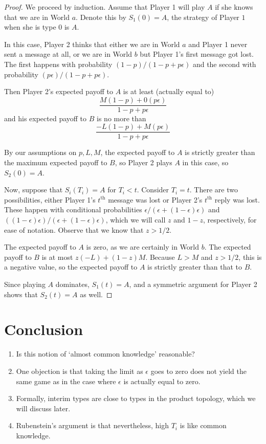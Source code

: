 \begin{proof}
	We proceed by induction.  Assume that Player 1 will play $A$ if she knows that we are in World $a$.  Denote this by $S_1(0)=A$, the strategy of Player $1$ when she is type 0 is $A$.
	
	In this case, Player 2 thinks that either we are in World $a$ and Player 1 never sent a message at all, or we are in World $b$ but Player 1's first message got lost.  The first happens with probability $(1-p)/(1-p+p\epsilon)$ and the second with probability $(p\epsilon)/(1-p+p\epsilon)$.
	
	Then Player 2's expected payoff to $A$ is at least (actually equal to)
	$$\frac{M(1-p)+0(p\epsilon)}{1-p+p\epsilon}$$ and his expected payoff to $B$ is no more than $$\frac{-L(1-p)+M(p\epsilon)}{1-p+p\epsilon}$$
	
	By our assumptions on $p,L,M$, the expected payoff to $A$ is strictly greater than the maximum expected payoff to $B$, so Player 2 plays $A$ in this case, so $S_2(0)=A$.
	
	Now, suppose that $S_i(T_i)=A$ for $T_i<t$.  Consider $T_i=t$.  There are two possibilities, either Player 1's $t^{\text{th}}$ message was lost or Player 2's $t^\text{th}$ reply was lost.  These happen with conditional probabilities $\epsilon/(\epsilon+(1-\epsilon)\epsilon)$ and $((1-\epsilon)\epsilon)/(\epsilon+(1-\epsilon)\epsilon)$, which we will call $z$ and $1-z$, respectively, for ease of notation.  Observe that we know that $z>1/2$.
	
	The expected payoff to $A$ is zero, as we are certainly in World $b$.  The expected payoff to $B$ is at most $z(-L)+(1-z)M$.  Because $L>M$ and $z>1/2$, this is a negative value, so the expected payoff to $A$ is strictly greater than that to $B$.
	
	Since playing $A$ dominates, $S_1(t)=A$, and a symmetric argument for Player 2 shows that $S_2(t)=A$ as well.
\end{proof}

\section{Conclusion}
\begin{enumerate}
	\item Is this notion of `almost common knowledge' reasonable?
	\item One objection is that taking the limit as $\epsilon$ goes to zero does not yield the same game as in the case where $\epsilon$ is actually equal to zero.
	\item Formally, interim types are close to types in the product topology, which we will discuss later.
	\item Rubenstein's argument is that nevertheless, high $T_i$ is like common knowledge.
\end{enumerate}